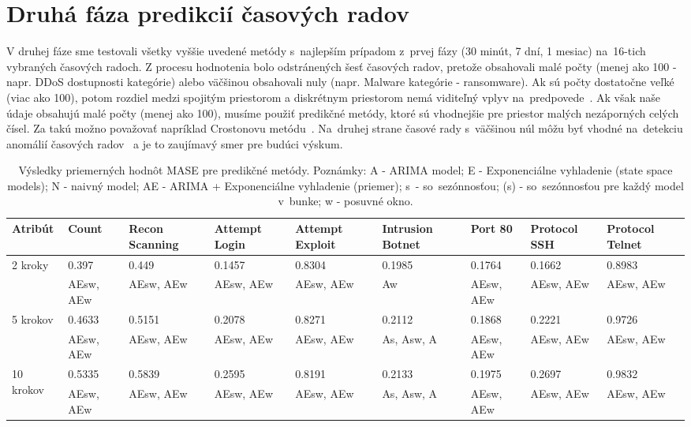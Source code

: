 \documentclass[thesismargins, thesislinespacing, openright, upjsfrontpage]{rnthesis}
\begin{document}
\section{Druhá fáza predikcií časových radov}

V druhej fáze sme testovali všetky vyššie uvedené metódy s~najlepším prípadom z~prvej fázy (30 minút, 7 dní, 1 mesiac) na~16-tich vybraných časových radoch. Z procesu hodnotenia bolo odstránených šesť časových radov, pretože obsahovali malé počty (menej ako 100 - napr. DDoS dostupnosti kategórie) alebo väčšinou obsahovali nuly (napr. Malware kategórie - ransomware). Ak sú počty dostatočne veľké (viac ako 100), potom rozdiel medzi spojitým priestorom a diskrétnym priestorom nemá viditeľný vplyv na~predpovede~\cite{hyndman2018forecasting}. Ak však naše údaje obsahujú malé počty (menej ako 100), musíme použiť predikčné metódy, ktoré sú vhodnejšie pre priestor malých nezáporných celých čísel. Za takú možno považovať napríklad Crostonovu metódu~\cite{Croston1972ForecastingAS, Christou2015}. Na~druhej strane časové rady s~väčšinou núl môžu byť vhodné na~detekciu anomálií časových radov~\cite{mehrotra2017anomaly} a je to zaujímavý smer pre budúci výskum.

\begin{table}[h]
    \centering
    \footnotesize 
    \begin{tabular}{|p{2cm}|p{1cm}|p{1.4cm}|p{1.2cm}|p{1.2cm}|p{1.4cm}|p{1cm}|p{1.2cm}|p{1.2cm}|} \hline
        Atribút & Count & Recon Scanning & Attempt Login & Attempt Exploit & Intrusion Botnet & Port 80 & Protocol SSH & Protocol Telnet  \\
        \hline\hline
        \multirow{2}{*}{2 kroky} & 0.397 & 0.449 & 0.1457 & 0.8304 & 0.1985 & 0.1764 & 0.1662 & 0.8983 \\
        & AEsw, AEw & AEsw, AEw & AEsw, AEw & AEsw, AEw & Aw & AEsw, AEw & AEsw, AEw & AEsw, AEw  \\
        \hline
        \multirow{2}{*}{5 krokov} & 0.4633 & 0.5151 & 0.2078 & 0.8271 & 0.2112 & 0.1868 & 0.2221 & 0.9726 \\
        & AEsw, AEw & AEsw, AEw & AEsw, AEw & AEsw, AEw & As, Asw, A & AEsw, AEw & AEsw, AEw & AEsw, AEw  \\
        \hline
        \multirow{2}{*}{10 krokov} & 0.5335 & 0.5839 & 0.2595 & 0.8191 & 0.2133 & 0.1975 & 0.2697 & 0.9832 \\
        & AEsw, AEw & AEsw, AEw & AEsw, AEw & AEsw, AEw & As, Asw, A & AEsw, AEw & AEsw, AEw & AEsw, AEw  \\
        \hline     
    \end{tabular}
    \caption{Výsledky priemerných hodnôt MASE pre predikčné metódy. Poznámky: A - ARIMA model; E - Exponenciálne vyhladenie (state space models); N - naivný model; AE - ARIMA + Exponenciálne vyhladenie (priemer); s~- so~sezónnosťou; (s) - so~sezónnosťou pre každý model v~bunke; w - posuvné okno.}
    \label{tab:mase_2nd_stage}
\end{table}
\end{document}
